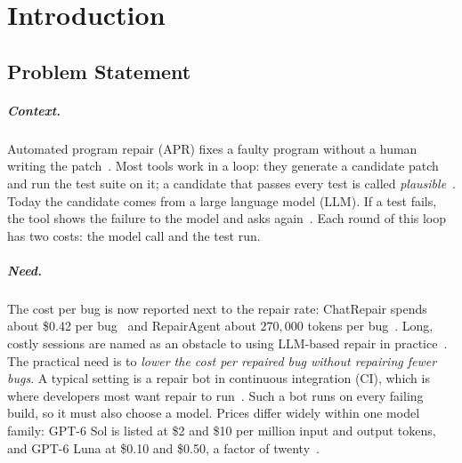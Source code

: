 \chapter{Introduction}
\label{ch:intro}

\section{Problem Statement}
\label{sec:intro-problem}

\paragraph{Context.} Automated program repair (APR) fixes a faulty program
without a human writing the patch~\citep{legoues2019apr}. Most tools work in a
loop: they generate a candidate patch and run the test suite on it; a candidate
that passes every test is called \emph{plausible}~\citep{qi2015plausibility}.
Today the candidate comes from a large language model (LLM). If a test fails,
the tool shows the failure to the model and asks again~\citep{xia2024chatrepair}.
Each round of this loop has two costs: the model call and the test run.

\paragraph{Need.} The cost per bug is now reported next to the repair rate:
ChatRepair spends about \$0.42 per bug~\citep{xia2024chatrepair} and
RepairAgent about $270{,}000$ tokens per
bug~\citep{bouzenia2025repairagent}. Long, costly sessions are named as an
obstacle to using LLM-based repair in practice~\citep{yang2025llmrepairsurvey}.
The practical need is to \emph{lower the cost per repaired bug without
repairing fewer bugs}. A typical setting is a repair bot in continuous
integration (CI), which is where developers most want repair to
run~\citep{noller2022trust}. Such a bot runs on every failing build, so it must
also choose a model. Prices differ widely within one model family: GPT-6 Sol is
listed at \$2 and \$10 per million input and output tokens, and GPT-6 Luna at
\$0.10 and \$0.50, a factor of twenty~\citep{aibusiness2026gpt6}.

